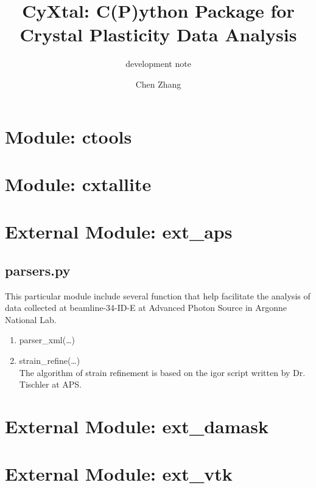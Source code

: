 \documentclass[12pt]{scrartcl}
\begin{document}
\title{CyXtal: C(P)ython Package for Crystal Plasticity Data Analysis}
\subtitle{development note}
\author{Chen Zhang}
\maketitle

\section{Module: ctools}

\section{Module: cxtallite}

\section{External Module: ext\_aps}

\subsection{parsers.py}
This particular module include several function that help facilitate the analysis of data collected at beamline-34-ID-E at Advanced Photon Source in Argonne National Lab.
%
\begin{enumerate}

\item parser\_xml(\ldots) \\

\item strain\_refine(\ldots) \\
The algorithm of strain refinement is based on the igor script written by Dr. Tischler at APS.
 
\end{enumerate}
\section{External Module: ext\_damask}

\section{External Module: ext\_vtk}
\end{document}
